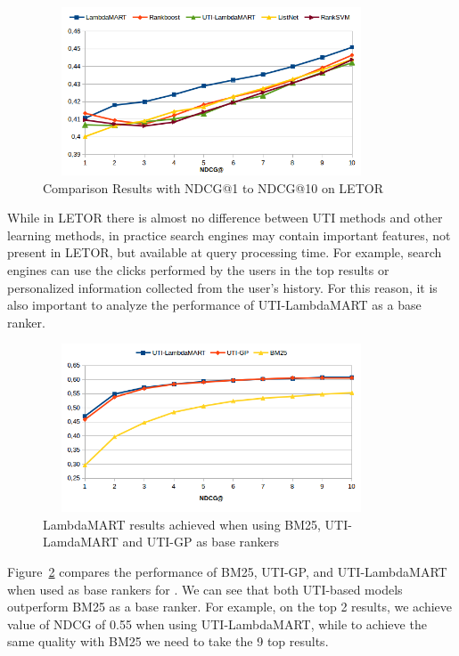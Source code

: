 \documentclass[preprint,review,10pt,3p]{elsarticle}
\begin{document}
\begin{figure}[ht!]

\begin{center}

\includegraphics[width=10cm, height=5cm]{im_ndcg_baseline.png}

\caption{Comparison Results with NDCG@1 to NDCG@10 on LETOR}

\label{fig:ndcg10}

\end{center}

\end{figure}

While in LETOR there is almost no difference between UTI methods and other
learning methods, in practice search engines may contain
important features, not present in LETOR, but available at query processing time. For example, search engines can use the clicks performed by the users in the top results or personalized information collected from the user's history. For this reason, it is also important to analyze the performance of UTI-LambdaMART as a base ranker.

\begin{figure}[ht!]
\centering
\includegraphics[width=10cm, height=5cm]{im_ndcg10leprefbm25.png}
\caption{LambdaMART results achieved when using BM25, UTI-LamdaMART and UTI-GP as base rankers}
\label{fig:bm25}
\end{figure}


Figure~\ref{fig:bm25} compares the
performance of BM25, UTI-GP, and UTI-LambdaMART when used as base rankers for \lambdamart.
We can see that both UTI-based models outperform BM25 as a base ranker. For example, on the top
2 results, we achieve value of NDCG of 0.55 when using
UTI-LambdaMART, while to achieve the same quality with BM25 we need to
take the 9 top results.
\end{document}

